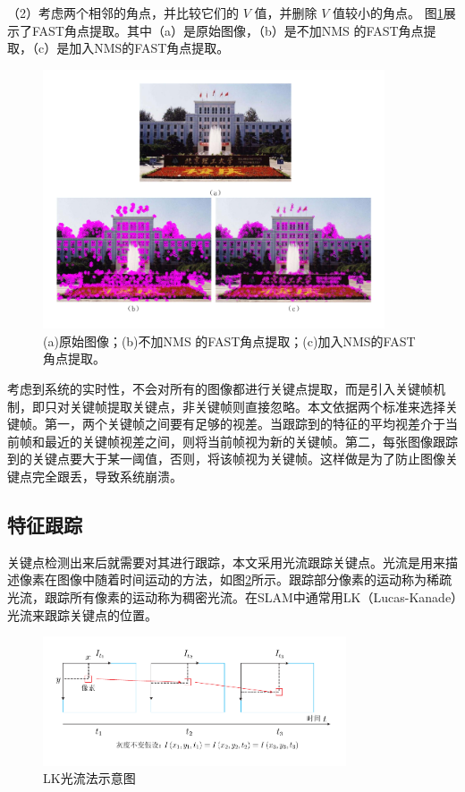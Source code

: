 （2）考虑两个相邻的角点，并比较它们的 $V$ 值，并删除 $V$ 值较小的角点。
图\ref{fig3_2}展示了FAST角点提取。其中（a）是原始图像，（b）是不加NMS 的FAST角点提取，（c）是加入NMS的FAST角点提取。
\begin{figure}[h]\setlength{\belowcaptionskip}{-12pt}
	\centering
	\includegraphics[width=0.9\textwidth]{figures/chapter3/fig3_2}
	\caption{(a)原始图像；(b)不加NMS 的FAST角点提取；(c)加入NMS的FAST角点提取。}\label{fig3_2}
\end{figure}

考虑到系统的实时性，不会对所有的图像都进行关键点提取，而是引入关键帧机制，即只对关键帧提取关键点，非关键帧则直接忽略。本文依据两个标准来选择关键帧。第一，两个关键帧之间要有足够的视差。当跟踪到的特征的平均视差介于当前帧和最近的关键帧视差之间，则将当前帧视为新的关键帧。第二，每张图像跟踪到的关键点要大于某一阈值，否则，将该帧视为关键帧。这样做是为了防止图像关键点完全跟丢，导致系统崩溃。
\subsection{特征跟踪}
关键点检测出来后就需要对其进行跟踪，本文采用光流跟踪关键点。光流是用来描述像素在图像中随着时间运动的方法，如图\ref{fig3_3}所示。跟踪部分像素的运动称为稀疏光流，跟踪所有像素的运动称为稠密光流。在SLAM中通常用LK（Lucas-Kanade）光流来跟踪关键点的位置。
\begin{figure}[h]\setlength{\belowcaptionskip}{-12pt}
	\centering
	\includegraphics[width=0.8\textwidth]{figures/chapter3/fig3_3}
	\caption{LK光流法示意图}\label{fig3_3}
\end{figure}

